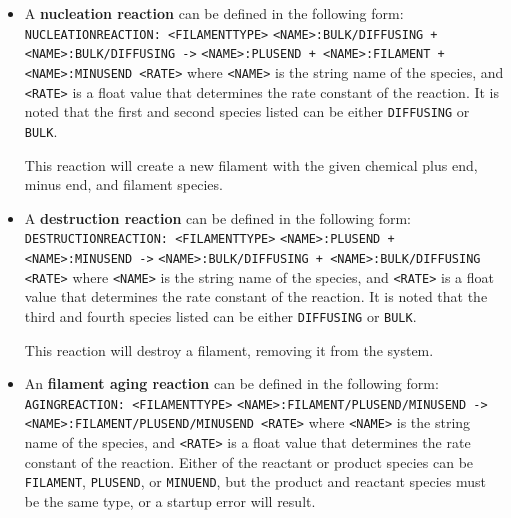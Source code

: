 \documentclass[11pt, oneside]{article}   	%
\begin{document}
\begin{itemize}
\item A \textbf{nucleation reaction} can be defined in the following form:\newline\newline
\texttt{NUCLEATIONREACTION: <FILAMENTTYPE>}\newline
\texttt{<NAME>:BULK/DIFFUSING + <NAME>:BULK/DIFFUSING ->}\newline
\texttt{<NAME>:PLUSEND + <NAME>:FILAMENT + <NAME>:MINUSEND <RATE>}\newline\newline
where \texttt{<NAME>} is the string name of the species, and \texttt{<RATE>} is a float value that determines the rate constant of the reaction. It is noted that the first and second species listed can be either \texttt{DIFFUSING} or \texttt{BULK}.

This reaction will create a new filament with the given chemical plus end, minus end, and filament species.

\item A \textbf{destruction reaction} can be defined in the following form:\newline\newline
\texttt{DESTRUCTIONREACTION: <FILAMENTTYPE>}\newline
\texttt{<NAME>:PLUSEND + <NAME>:MINUSEND ->}\newline
\texttt{<NAME>:BULK/DIFFUSING + <NAME>:BULK/DIFFUSING <RATE>}\newline\newline
where \texttt{<NAME>} is the string name of the species, and \texttt{<RATE>} is a float value that determines the rate constant of the reaction. It is noted that the third and fourth species listed can be either \texttt{DIFFUSING} or \texttt{BULK}.

This reaction will destroy a filament, removing it from the system.

\item An \textbf{filament aging reaction} can be defined in the following form:\newline\newline
\texttt{AGINGREACTION: <FILAMENTTYPE>}\newline
\texttt{<NAME>:FILAMENT/PLUSEND/MINUSEND ->}\newline
\texttt{<NAME>:FILAMENT/PLUSEND/MINUSEND <RATE>}\newline\newline
where \texttt{<NAME>} is the string name of the species, and \texttt{<RATE>} is a float value that determines the rate constant of the reaction. Either of the reactant or product species can be \texttt{FILAMENT}, \texttt{PLUSEND}, or \texttt{MINUEND}, but the product and reactant species must be the same type, or a startup error will result.


\end{itemize}
\end{document}
